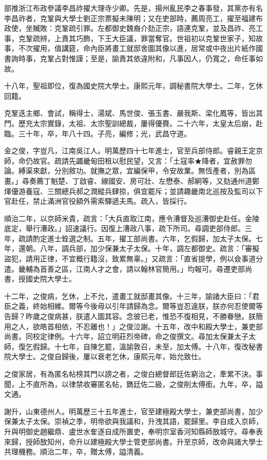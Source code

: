 \begin{pinyinscope}
部推浙江布政參議李昌祚擢大理寺少卿。先是，揚州亂民李之春事發，其黨亦有名李昌祚者，克鞏與大學士劉正宗票擬未陳明；又在吏部時，薦周亮工，擢至福建布政使，坐贓敗：克鞏疏引罪。左都御史魏裔介劾正宗，語連克鞏，並及昌祚、亮工事，克鞏疏辨，上責其巧飾，下王大臣議，罪當奪官。世祖初以克鞏世家子，知故事，不次擢用，值講筵，命內臣將畫工就邸舍圖其像以進，居常或中夜出片紙作國書詢時事，克鞏占對惟謹；至是，諭責其依違附和，凡事因人，仍寬之，命任事如故。

十八年，聖祖即位，復為國史院大學士。康熙元年，調秘書院大學士。二年，乞休回籍。

克鞏迭主鄉、會試，稱得士，湯斌、馬世俊、張玉書、嚴我斯、梁化鳳等，皆出其門。歷充太宗實錄，太祖、太宗聖訓總裁，屢得優賚。二十六年，太皇太后崩，赴臨。三十年，卒，年八十四。子亮，編修；光，武昌守道。

金之俊，字豈凡，江南吳江人。明萬歷四十七年進士，官至兵部侍郎。睿親王定京師，命仍故官。疏請先蠲畿甸田租以慰民望，又言：「土寇率★降者，宜赦罪勿論。縛渠來獻，分別敘功。就撫之眾，宜編保甲，令安故業。無恆產者，別為區畫。」尋奏薦丁魁楚、丁啟睿、線國安、房可壯、左懋泰、郝絅等，又劾通州道鄭煇優游養寇、三關總兵郝之潤縱兵肆掠，俱宜罷斥；並請趣畿南北巡按及監司以下官赴任，禁止滿洲官役額外需索驛遞夫馬。疏入，皆採行。

順治二年，以京師米貴，疏言：「大兵直取江南，應令漕督及巡漕御史赴任。金陵底定，舉行漕政。」詔速議行。因復上漕政八事，疏下所司。尋調吏部侍郎。三年，疏請酌定進士銓選之制。五年，擢工部尚書。六年，乞假歸，加太子太保。七年，還朝。八年，調兵部，加少保兼太子太保。十年，調左都御史。疏言：「審擬盜犯，請用正律，不宜概行籍沒，致累無辜。」又疏言：「直省提學，例以僉事道分遣。畿輔為首善之區，江南人才之會，請以翰林官簡用。」均報可。尋遷吏部尚書，授國史院大學士。

十二年，之俊病，乞休，上不允，遣畫工就邸畫其像。十三年，諭諸大臣曰：「君臣之義，終始相維。爾等今後毋以引年請歸為念。爾等豈忍違朕，朕亦何忍使爾等告歸？昨歲之俊病甚，朕遣人圖其容。念彼已老，惟恐不復相見，不勝眷戀。朕簡用之人，欲皓首相依，不忍離也！」之俊泣謝。十五年，改中和殿大學士，兼吏部尚書。同校定律例。十六年，詔立明莊烈帝碑，命之俊撰文。尋加太保兼太子太師，復乞假歸。十七年，自陳乞罷，溫諭敦召，未至，加太傅。十八年，復改秘書院大學士。之俊自歸後，屢以衰老乞休，康熙元年，始允致仕。

之俊家居，有為匿名帖榜其門以謗之者，之俊白總督郎廷佐窮治之，牽累不決。事聞，上不直所為，以律禁收審匿名帖，鐫廷佐二級，之俊削太傅銜。九年，卒，謚文通。

謝升，山東德州人。明萬歷三十五年進士，官至建極殿大學士，兼吏部尚書，加少保兼太子太保。崇禎之季，明帝欲與我議和，升洩其語，罷歸里。李自成入京師，升與明御史趙繼鼎、盧世水隺逐自成所置吏，奉明宗室香河知縣師敔城守。尋奉表來歸，授師敔知州，命升以建極殿大學士管吏部尚書。升至京師，改命與諸大學士共理機務。順治二年，卒，贈太傅，謚清義。


\end{pinyinscope}
